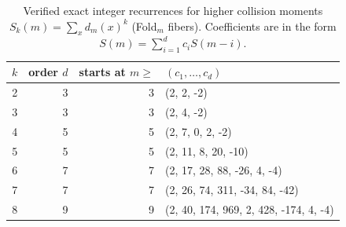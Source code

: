 \begin{table}[H]
\centering
\scriptsize
\setlength{\tabcolsep}{6pt}
\caption{Verified exact integer recurrences for higher collision moments $S_k(m)=\sum_x d_m(x)^k$ (Fold$_m$ fibers). Coefficients are in the form $S(m)=\sum_{i=1}^d c_i S(m-i)$.}
\label{tab:fold_collision_moment_recursions}
\begin{tabular}{r r r l}
\toprule
$k$ & order $d$ & starts at $m\ge$ & $(c_1,\dots,c_d)$\\
\midrule
2 & 3 & 3 & (2, 2, -2)\\
3 & 3 & 3 & (2, 4, -2)\\
4 & 5 & 5 & (2, 7, 0, 2, -2)\\
5 & 5 & 5 & (2, 11, 8, 20, -10)\\
6 & 7 & 7 & (2, 17, 28, 88, -26, 4, -4)\\
7 & 7 & 7 & (2, 26, 74, 311, -34, 84, -42)\\
8 & 9 & 9 & (2, 40, 174, 969, 2, 428, -174, 4, -4)\\
\bottomrule
\end{tabular}
\end{table}
